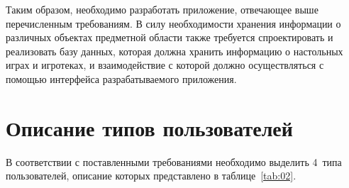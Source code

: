 Таким образом, необходимо разработать приложение, отвечающее выше перечисленным
требованиям. В силу необходимости хранения информации о различных объектах
предметной области также требуется спроектировать и реализовать базу данных,
которая должна хранить информацию о настольных играх и игротеках, и
взаимодействие с которой должно осуществляться с помощью интерфейса
разрабатываемого приложения.

\section{Описание типов пользователей}

В соответствии с поставленными требованиями необходимо выделить 4~типа
пользователей, описание которых представлено в таблице~\ref{tab:02}.

\clearpage
